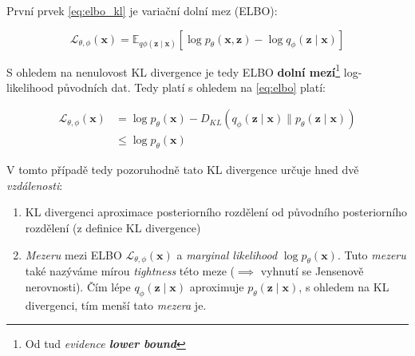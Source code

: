 První prvek \autoref{eq:elbo_kl} je variační dolní mez (ELBO):

\begin{equation} \label{eq:elbo}
    \mathcal{L}_{\theta,\phi}(\textbf{x}) = \mathds{E}_{q\phi(\textbf{z}\mid\textbf{x})}[\log p_\theta(\textbf{x},\textbf{z}) - \log q_\phi(\textbf{z}\mid\textbf{x})]
\end{equation}

S ohledem na nenulovost KL divergence je tedy ELBO \textbf{dolní mezí}\footnote{Od tud \emph{evidence \textbf{lower bound}}} log-likelihood původních dat.
Tedy platí s ohledem na \autoref{eq:elbo} platí:

\begin{align}
    \mathcal{L}_{\theta,\phi}(\textbf{x}) &= \log p_\theta(\textbf{x}) - D_{KL}(q_\phi(\textbf{z}\mid\textbf{x})\parallel p_\theta(\textbf{z}\mid\textbf{x})) \\
                                          &\leq \log p_\theta(\textbf{x})
\end{align}

V tomto případě tedy pozoruhodně tato KL divergence určuje hned dvě \emph{vzdálenosti}:
\begin{enumerate}
    \item KL divergenci aproximace posteriorního rozdělení od původního posteriorního rozdělení (z definice KL divergence)
    \item \emph{Mezeru} mezi ELBO $\mathcal{L}_{\theta,\phi}(\textbf{x})$ a \emph{marginal likelihood} $\log p_\theta(\textbf{x})$. Tuto \emph{mezeru} také nazýváme mírou \emph{tightness} této meze ($\implies$ vyhnutí se Jensenově nerovnosti). Čím lépe $q_\phi(\textbf{z}\mid\textbf{x})$ aproximuje $p_\theta(\textbf{z}\mid\textbf{x})$, s ohledem na KL divergenci, tím menší tato \emph{mezera} je.
\end{enumerate}

